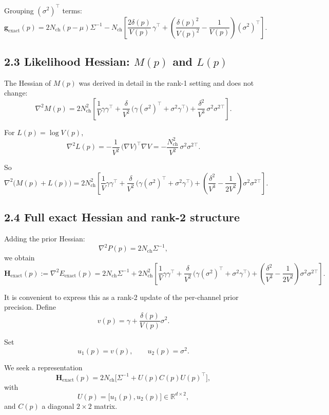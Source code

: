 \documentclass[11pt]{article}
\begin{document}
Grouping $(\sigma^2)^\top$ terms:
\[
  \boxed{
  \mathbf{g}_{\text{exact}}(p)
  =
  2N_{\text{ch}}(p-\mu)\Sigma^{-1}
  -
  N_{\text{ch}}
  \left[
    \frac{2\delta(p)}{V(p)}\,\gamma^\top
    +
    \left(\frac{\delta(p)^2}{V(p)^2} - \frac{1}{V(p)}\right)(\sigma^2)^\top
  \right].
  }
\]

\subsection*{2.3 Likelihood Hessian: $M(p)$ and $L(p)$}

The Hessian of $M(p)$ was derived in detail in the rank-1 setting and
does not change:
\[
  \nabla^2 M(p)
  =
  2N_{\text{ch}}^2
  \left[
    \frac{1}{V}\gamma\gamma^\top
    + \frac{\delta}{V^2}\,
      \bigl(\gamma(\sigma^2)^\top + \sigma^2\gamma^\top\bigr)
    + \frac{\delta^2}{V^3}\,\sigma^2\sigma^2{}^\top
  \right].
\]

For $L(p) = \log V(p)$,
\[
  \nabla^2 L(p)
  = -\frac{1}{V^2}\,\bigl(\nabla V\bigr)^\top\nabla V
  = -\frac{N_{\text{ch}}^2}{V^2}\,\sigma^2\sigma^2{}^\top.
\]

So
\[
  \nabla^2\bigl(M(p)+L(p)\bigr)
  =
  2N_{\text{ch}}^2
  \left[
    \frac{1}{V}\gamma\gamma^\top
    + \frac{\delta}{V^2}\,
      \bigl(\gamma(\sigma^2)^\top + \sigma^2\gamma^\top\bigr)
    + \left(\frac{\delta^2}{V^3} - \frac{1}{2V^2}\right)
      \sigma^2\sigma^2{}^\top
  \right].
\]

\subsection*{2.4 Full exact Hessian and rank-2 structure}

Adding the prior Hessian:
\[
  \nabla^2 P(p) = 2N_{\text{ch}}\Sigma^{-1},
\]
we obtain
\[
  \mathbf{H}_{\text{exact}}(p)
  := \nabla^2 E_{\text{exact}}(p)
  =
  2N_{\text{ch}}\Sigma^{-1}
  +
  2N_{\text{ch}}^2
  \left[
    \frac{1}{V}\gamma\gamma^\top
    + \frac{\delta}{V^2}\,
      \bigl(\gamma(\sigma^2)^\top + \sigma^2\gamma^\top\bigr)
    + \left(\frac{\delta^2}{V^3} - \frac{1}{2V^2}\right)
      \sigma^2\sigma^2{}^\top
  \right].
\]

It is convenient to express this as a rank-2 update of the per-channel
prior precision.  Define
\[
  v(p) = \gamma + \frac{\delta(p)}{V(p)}\sigma^2.
\]

Set
\[
  u_1(p) = v(p),
  \qquad
  u_2(p) = \sigma^2.
\]

We seek a representation
\[
  \mathbf{H}_{\text{exact}}(p)
  = 2N_{\text{ch}}\bigl[\Sigma^{-1} + U(p)C(p)U(p)^\top\bigr],
\]
with
\[
  U(p) = \bigl[u_1(p), u_2(p)\bigr] \in \mathbb{R}^{d\times 2},
\]
and $C(p)$ a diagonal $2\times 2$ matrix.
\end{document}
